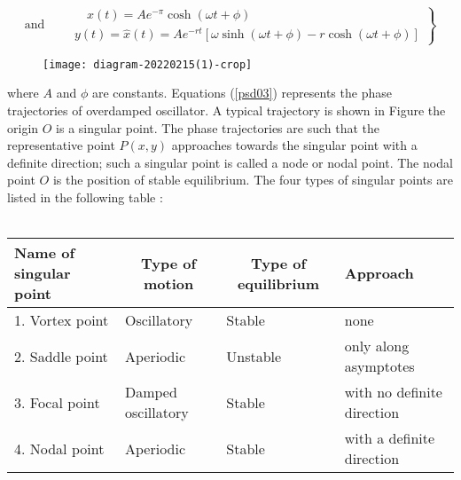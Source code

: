 \begin{equation}
\text{and}\qquad
\left.\begin{array}{l}
\quad x(t)=A e^{-\pi} \cosh (\omega t+\phi) \\
y(t)=\hat{x}(t)=A e^{-r t}[\omega \sinh (\omega t+\phi)-r \cosh (\omega t+\phi)]
\end{array}\right\}\label{psd03}
\end{equation}
\begin{figure}[H]
	\centering
	\texttt{[image: diagram-20220215(1)-crop]}
	\caption{}
	\label{}
\end{figure}
where $A$ and $\phi$ are constants. Equations (\ref{psd03}) represents the phase trajectories of overdamped oscillator. A typical trajectory is shown in Figure  the origin $O$ is a singular point. The phase trajectories are such that the representative point $P(x, y)$ approaches towards the singular point with a definite direction; such a singular point is called a node or nodal point. The nodal point $O$ is the position of stable equilibrium. The four types of singular points are listed in the following table :\\\\
\begin{tabular}{|l|l|l|l|}
	\hline Name of singular point & \multicolumn{1}{|c|}{ Type of motion } & \multicolumn{1}{|c|}{ Type of equilibrium } & Approach \\
	\hline 1. Vortex point & Oscillatory & Stable & none \\
	\hline 2. Saddle point & Aperiodic & Unstable & only along asymptotes \\
	\hline 3. Focal point & Damped oscillatory & Stable & with no definite direction \\
	\hline 4. Nodal point & Aperiodic & Stable & with a definite direction \\
	\hline
\end{tabular}
